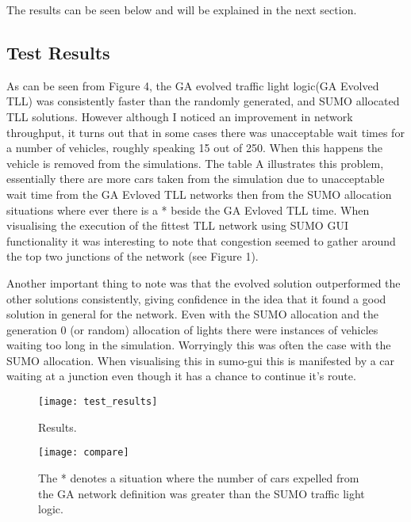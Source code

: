 \documentclass[a4paper,10pt]{article}
\begin{document}
The results can be seen below and will be explained in the next section.
\newline
\newline
\newline
\newline
\subsection{Test Results}

As can be seen from Figure 4, the GA evolved traffic light logic(GA Evolved TLL) was consistently faster than the randomly generated,
and SUMO allocated TLL solutions. However although I noticed an improvement in network throughput, it turns out that in some cases 
there was unacceptable wait times for a number of vehicles, roughly speaking 15 out of 250. When this happens the vehicle is removed 
from the simulations. The table A illustrates this problem, essentially there are more cars taken from the simulation due to 
unacceptable wait time from the GA Evloved TLL networks then from the SUMO allocation situations where ever there is a * beside the 
GA Evloved TLL time. When visualising the execution of the fittest TLL network using SUMO GUI functionality it was interesting to 
note that congestion seemed to gather around the top two junctions of the network (see Figure 1).

Another important thing to note was that the evolved solution outperformed the other solutions consistently, 
giving confidence in the idea that it found a good solution in general for the network. Even with the SUMO allocation and the 
generation 0 (or random) allocation of lights there were instances of vehicles waiting too long in the simulation. Worryingly this was
often the case with the SUMO allocation. When visualising this in sumo-gui this is manifested by a car waiting at a junction even though 
it has a chance to continue it's route.
\newline
\begin{figure}[h!]
  \caption{Results.}
  \centering
    \texttt{[image: test\_results]}
\end{figure}

\begin{figure}[h!]
  \caption{The * denotes a situation where the number of cars expelled from the GA network definition was greater than the SUMO traffic light logic.}
  \centering
    \texttt{[image: compare]}
\end{figure}
\end{document}
